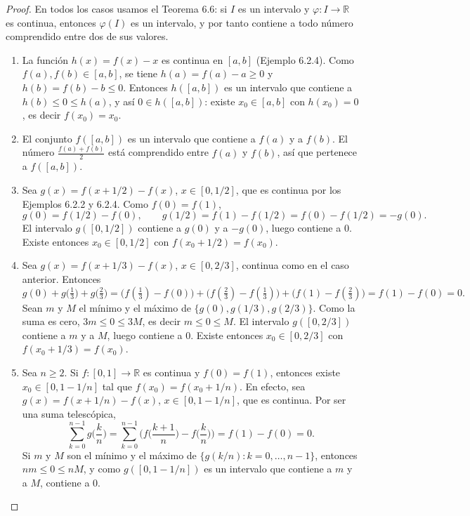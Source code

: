 \documentclass[11pt]{article}
\newcommand{\R}{\mathbb{R}}
\begin{document}
  \begin{proof}
  En todos los casos usamos el Teorema 6.6: si $I$ es un intervalo y $\varphi:I\to\R$ es continua, entonces $\varphi(I)$ es un intervalo, y por tanto contiene a todo número comprendido entre dos de sus valores.

  \begin{enumerate}
  \item La función $h(x)=f(x)-x$ es continua en $[a,b]$ (Ejemplo 6.2.4). Como $f(a),f(b)\in[a,b]$, se tiene $h(a)=f(a)-a\ge 0$ y $h(b)=f(b)-b\le 0$. Entonces $h([a,b])$ es un intervalo que contiene a $h(b)\le 0\le h(a)$, y así $0\in h([a,b])$: existe $x_0\in[a,b]$ con $h(x_0)=0$, es decir $f(x_0)=x_0$.

  \item El conjunto $f([a,b])$ es un intervalo que contiene a $f(a)$ y a $f(b)$. El número $\frac{f(a)+f(b)}2$ está comprendido entre $f(a)$ y $f(b)$, así que pertenece a $f([a,b])$.

  \item Sea $g(x)=f(x+1/2)-f(x)$, $x\in[0,1/2]$, que es continua por los Ejemplos 6.2.2 y 6.2.4. Como $f(0)=f(1)$,
  \[
  g(0)=f(1/2)-f(0),\qquad g(1/2)=f(1)-f(1/2)=f(0)-f(1/2)=-g(0).
  \]
  El intervalo $g([0,1/2])$ contiene a $g(0)$ y a $-g(0)$, luego contiene a $0$. Existe entonces $x_0\in[0,1/2]$ con $f(x_0+1/2)=f(x_0)$.

  \item Sea $g(x)=f(x+1/3)-f(x)$, $x\in[0,2/3]$, continua como en el caso anterior. Entonces
  \[
  g(0)+g\big(\tfrac13\big)+g\big(\tfrac23\big)=\big(f(\tfrac13)-f(0)\big)+\big(f(\tfrac23)-f(\tfrac13)\big)+\big(f(1)-f(\tfrac23)\big)=f(1)-f(0)=0.
  \]
  Sean $m$ y $M$ el mínimo y el máximo de $\{g(0),g(1/3),g(2/3)\}$. Como la suma es cero, $3m\le 0\le 3M$, es decir $m\le 0\le M$. El intervalo $g([0,2/3])$ contiene a $m$ y a $M$, luego contiene a $0$. Existe entonces $x_0\in[0,2/3]$ con $f(x_0+1/3)=f(x_0)$.

  \item Sea $n\ge 2$. Si $f:[0,1]\to\R$ es continua y $f(0)=f(1)$, entonces existe $x_0\in[0,1-1/n]$ tal que $f(x_0)=f(x_0+1/n)$. En efecto, sea $g(x)=f(x+1/n)-f(x)$, $x\in[0,1-1/n]$, que es continua. Por ser una suma telescópica,
  \[
  \sum_{k=0}^{n-1}g\Big(\frac kn\Big)=\sum_{k=0}^{n-1}\Big(f\Big(\frac{k+1}n\Big)-f\Big(\frac kn\Big)\Big)=f(1)-f(0)=0.
  \]
  Si $m$ y $M$ son el mínimo y el máximo de $\{g(k/n):k=0,\dots,n-1\}$, entonces $nm\le 0\le nM$, y como $g([0,1-1/n])$ es un intervalo que contiene a $m$ y a $M$, contiene a $0$.
  \end{enumerate}
  \end{proof}
\end{document}
